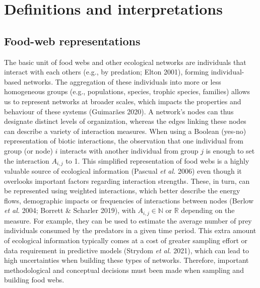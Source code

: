 \documentclass[10pt,oneside]{article}
\begin{document}
\hypertarget{definitions-and-interpretations}{%
\section{Definitions and
interpretations}\label{definitions-and-interpretations}}

\hypertarget{food-web-representations}{%
\subsection{Food-web representations}\label{food-web-representations}}

The basic unit of food webs and other ecological networks are
individuals that interact with each others (e.g., by predation; Elton
2001), forming individual-based networks. The aggregation of these
individuals into more or less homogeneous groups (e.g., populations,
species, trophic species, families) allows us to represent networks at
broader scales, which impacts the properties and behaviour of these
systems (Guimarães 2020). A network's nodes can thus designate distinct
levels of organization, whereas the edges linking these nodes can
describe a variety of interaction measures. When using a Boolean
(yes-no) representation of biotic interactions, the observation that one
individual from group (or node) \(i\) interacts with another individual
from group \(j\) is enough to set the interaction \(A_{i,j}\) to 1. This
simplified representation of food webs is a highly valuable source of
ecological information (Pascual \emph{et al.} 2006) even though it
overlooks important factors regarding interaction strengths. These, in
turn, can be represented using weighted interactions, which better
describe the energy flows, demographic impacts or frequencies of
interactions between nodes (Berlow \emph{et al.} 2004; Borrett \&
Scharler 2019), with \(A_{i,j} \in \mathbb{N}\) or \(\mathbb{R}\)
depending on the measure. For example, they can be used to estimate the
average number of prey individuals consumed by the predators in a given
time period. This extra amount of ecological information typically comes
at a cost of greater sampling effort or data requirement in predictive
models (Strydom \emph{et al.} 2021), which can lead to high
uncertainties when building these types of networks. Therefore,
important methodological and conceptual decisions must been made when
sampling and building food webs.
\end{document}
